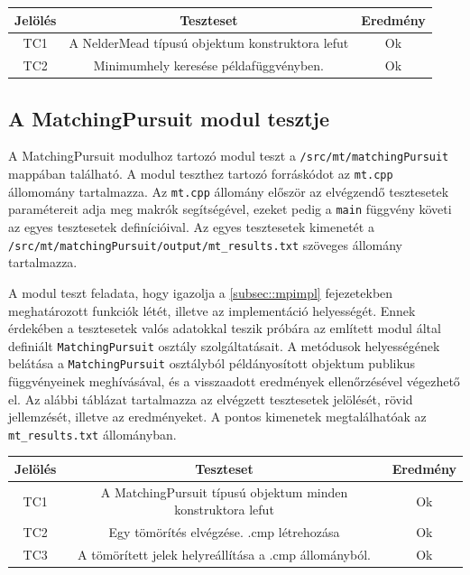 \documentclass[oneside,titlepage,12pt,a4paper]{report}
\begin{document}
\begin{center}
\begin{adjustbox}{width=1\textwidth}
 \begin{tabular}{||c c c||} 
 \hline
 Jelölés & Teszteset & Eredmény\\ [0.5ex] 
 \hline\hline
 TC1 & A NelderMead típusú objektum konstruktora lefut &  Ok \\ 
 \hline
 TC2 &
 Minimumhely keresése példafüggvényben.
 &  Ok \\
 \hline
\end{tabular}
\end{adjustbox}
\end{center}

\subsection{A MatchingPursuit modul tesztje}

A MatchingPursuit modulhoz tartozó modul teszt a \texttt{/src/mt/matchingPursuit} mappában található. A modul teszthez tartozó forráskódot az \texttt{mt.cpp} állomomány tartalmazza. Az \texttt{mt.cpp} állomány először az elvégzendő tesztesetek paramétereit adja \linebreak meg makrók segítségével, ezeket pedig a \texttt{main} függvény követi az egyes  \linebreak tesztesetek definícióival. Az egyes tesztesetek kimenetét a \linebreak \texttt{/src/mt/matchingPursuit/output/mt\_results.txt} szöveges állomány tartalmazza. 
\par A modul teszt feladata, hogy igazolja a \ref{subsec::mpimpl} fejezetekben meghatározott funkciók létét, illetve az implementáció helyességét. Ennek érdekében a tesztesetek valós adatokkal teszik próbára az említett modul által definiált \texttt{MatchingPursuit} osztály szolgáltatásait. A metódusok helyességének belátása a \texttt{MatchingPursuit} osztályból példányosított objektum publikus függvényeinek meghívásával, és a visszaadott eredmények ellenőrzésével végezhető el. Az alábbi táblázat tartalmazza az elvégzett tesztesetek jelölését, rövid jellemzését,  illetve az eredményeket. A pontos kimenetek megtalálhatóak az \texttt{mt\_results.txt} állományban.

\begin{center}
\begin{adjustbox}{width=1\textwidth}
 \begin{tabular}{||c c c||} 
 \hline
 Jelölés & Teszteset & Eredmény \\ [0.5ex] 
 \hline\hline
 TC1 & A MatchingPursuit típusú objektum minden konstruktora lefut &  Ok\\ 
 \hline
 TC2 & Egy tömörítés elvégzése. .cmp létrehozása &  Ok\\
 \hline
 TC3 & A tömörített jelek helyreállítása a .cmp állományból. & Ok \\
 \hline
\end{tabular}
\end{adjustbox}
\end{center}
\end{document}
